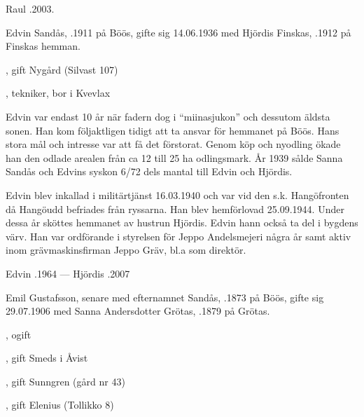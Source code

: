 Raul .2003.


%


%
Edvin Sandås, .1911 på Böös, gifte sig 14.06.1936 med Hjördis	Finskas, .1912 på Finskas hemman.
\begin{jhchildren}
  \item {}, gift Nygård (Silvast  107)
  \item {}
  \item {}, tekniker, bor i Kvevlax
\end{jhchildren}
Edvin var endast 10 år när fadern dog i ``miinasjukon'' och dessutom äldsta sonen. Han kom följaktligen tidigt att ta ansvar för hemmanet på Böös. Hans stora mål och intresse var att få det förstorat. Genom köp och nyodling ökade han den odlade arealen från ca 12 till 25 ha odlingsmark. År 1939 sålde Sanna Sandås och Edvins syskon 6/72 dels mantal till Edvin och Hjördis.

Edvin blev inkallad i militärtjänst 16.03.1940 och var vid den s.k. Hangöfronten då Hangöudd befriades från ryssarna. Han blev hemförlovad 25.09.1944. Under dessa år sköttes hemmanet av hustrun Hjördis. Edvin hann också ta del i bygdens värv. Han var ordförande i styrelsen för Jeppo Andelsmejeri några år samt aktiv inom grävmaskinsfirman Jeppo Gräv, bl.a som direktör.

Edvin .1964  ---  Hjördis .2007



%
Emil Gustafsson, senare med efternamnet Sandås, .1873 på Böös, gifte sig 29.07.1906 med Sanna Andersdotter Grötas, .1879 på Grötas.
\begin{jhchildren}
  \item {}, ogift
  \item {}, gift Smeds i Åvist
  \item {}
  \item {}, gift Sunngren (gård nr 43)
  \item {}, gift Elenius (Tollikko 8)
  \item {}
\end{jhchildren}

